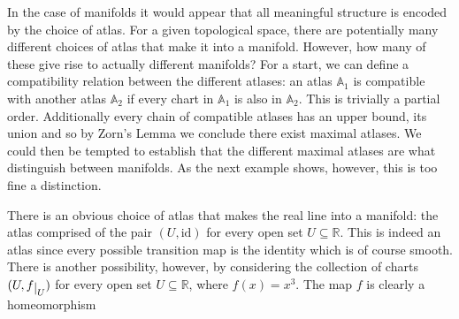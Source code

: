 \documentclass[12pt,oneside]{book}
\numberwithin{table}{section}
\numberwithin{equation}{section}
\numberwithin{figure}{section}
\newcommand{\rest}[1]{\raisebox{-.5ex}{$|$}_{#1}}
\newcommand{\R}{\mathbb{R}}
\newcommand{\A}{\mathbb{A}}
\newcommand{\id}{\mathrm{id}}
\begin{document}
In the case of manifolds it would appear that all meaningful structure is encoded by the choice of atlas. For a given topological space, there are potentially many different choices of atlas that make it into a manifold. However, how many of these give rise to actually different manifolds? For a start, we can define a compatibility relation between the different atlases: an atlas \( \A_1 \) is compatible with another atlas \( \A_2 \) if every chart in \( \A_1 \) is also in \( \A_2 \). This is trivially a partial order. Additionally every chain of compatible atlases has an upper bound, its union and so by Zorn's Lemma we conclude there exist maximal atlases. We could then be tempted to establish that the different maximal atlases are what distinguish between manifolds. As the next example shows, however, this is too fine a distinction.

\begin{exe}
	There is an obvious choice of atlas that makes the real line into a manifold: the atlas comprised of the pair \( (U, \id) \) for every open set \( U \subseteq \R \). This is indeed an atlas since every possible transition map is the identity which is of course smooth. There is another possibility, however, by considering the collection of charts \( (U, f\rest{U}) \) for every open set \( U \subseteq \R \), where \( f(x) = x^3 \). The map \( f \) is clearly a homeomorphism 
\end{exe}
\end{document}

